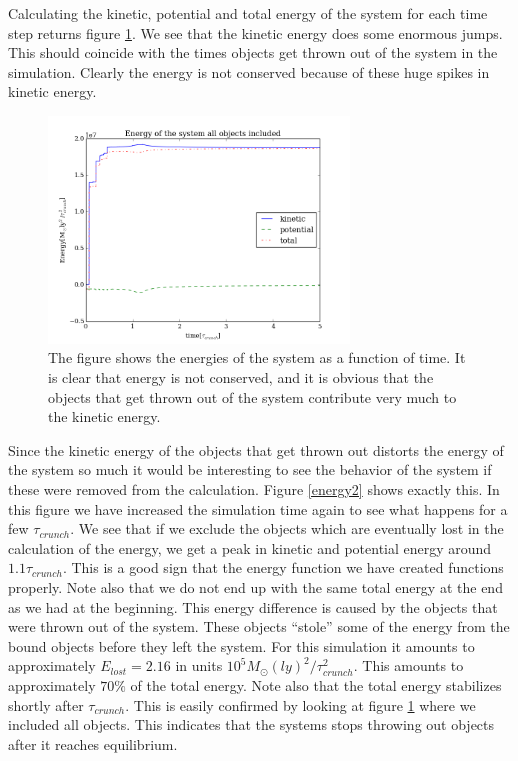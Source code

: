 \documentclass{aa}   %
\begin{document}
Calculating the kinetic, potential and total energy of the system for each time step returns figure \ref{energy1}. We see that the kinetic energy does some enormous jumps. This should coincide with the times objects get thrown out of the system in the simulation. Clearly the energy is not conserved because of these huge spikes in kinetic energy.
\begin{figure}[hbtp]
 \centering
 \includegraphics[width=80mm]{energy1.png}
 \caption[]{\label{energy1}
   The figure shows the energies of the system as a function of time. It is clear that energy is not conserved, and it is obvious that the objects that get thrown out of the system contribute very much to the kinetic energy. 
 }
\end{figure}
Since the kinetic energy of the objects that get thrown out distorts the energy of the system so much it would be interesting to see the behavior of the system if these were removed from the calculation. Figure \ref{energy2} shows exactly this. In this figure we have increased the simulation time again to see what happens for a few $\tau_{crunch}$. We see that if we exclude the objects which are eventually lost in the calculation of the energy, we get a peak in kinetic and potential energy around $1.1\tau_{crunch}$. This is a good sign that the energy function we have created functions properly. Note also that we do not end up with the same total energy at the end as we had at the beginning. This energy difference is caused by the objects that were thrown out of the system. These objects ``stole'' some of the energy from the bound objects before they left the system. For this simulation it amounts to approximately $E_{lost} = 2.16$ in units $10^5 M_\odot (ly)^2/\tau_{crunch}^2$. This amounts to approximately $70\%$ of the total energy.
Note also that the total energy stabilizes shortly after $\tau_{crunch}$. This is easily confirmed by looking at figure \ref{energy1} where we included all objects. This indicates that the systems stops throwing out objects after it reaches equilibrium.
\end{document}
